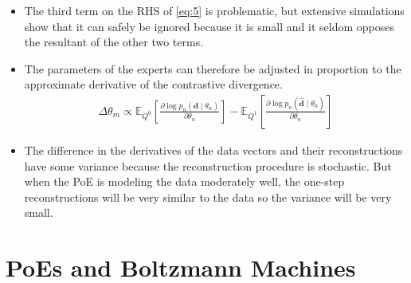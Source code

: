 \documentclass[10pt]{article}
\newcommand{\EE}{\mathbb{E}}
\begin{document}
\begin{itemize}
\item The third term on the RHS of \eqref{eq:5} is problematic, but extensive simulations show that it can safely be ignored because it is small and it seldom opposes the resultant of the other two terms.
\item The parameters of the experts can therefore be adjusted in proportion to the approximate derivative of the contrastive divergence.
\begin{align*}
\Delta \theta_m \propto \EE_{Q^0} \left[ \frac{\partial \log p_n(\mathbf{d} \mid \theta_n)}{\partial \theta_n} \right] - \EE_{Q^1} \left[ \frac{\partial \log p_n(\mathbf{\hat{\mathbf{d}}} \mid \theta_n)}{\partial \theta_n} \right]
\end{align*}
\item The difference in the derivatives of the data vectors and their reconstructions have some variance because the reconstruction procedure is stochastic. But when the PoE is modeling the data moderately well, the one-step reconstructions will be very similar to the data so the variance will be very small.
\end{itemize}

\newpage

\setcounter{section}{6}
\section{PoEs and Boltzmann Machines}
\end{document}
